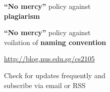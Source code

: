 {\begin{frame}[plain]
\end{frame}
}

\begin{frame}
\begin{center}
\large
	\textbf{``No mercy''} policy against\\\textbf{plagiarism}
\end{center}
\end{frame}

\begin{frame}
\begin{center}
\large
	\textbf{``No mercy''} policy against\\voilation of \textbf{naming convention}
\end{center}
\end{frame}

\begin{frame}
\begin{center}
\large
	\url{http://blog.nus.edu.sg/cs2105}
\end{center}
\end{frame}

\begin{frame}
\begin{center}
\large
Check for updates frequently and\\subscribe via email or RSS
\end{center}
\end{frame}

